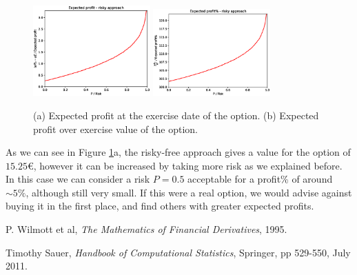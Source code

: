 \documentclass[8 pt]{article}
\begin{document}
\begin{figure}[H]
  \begin{center}
    \includegraphics[width=0.4\textwidth]{graphs/P-oP.eps}
    \includegraphics[width=0.4\textwidth]{graphs/P-Profit.eps}
    \caption{(a) Expected profit at the exercise date of the option. (b) Expected profit over exercise value of the option.}
    \label{fig:oP_plots}
  \end{center}
\end{figure}

As we can see in Figure \ref{fig:oP_plots}a, the risky-free approach gives a value for the option of $15.25$\euro, however it can be increased by taking more risk as we explained before. In this case we can consider a risk $P = 0.5$ acceptable for a profit\% of around $\sim 5\%$, although still very small. If this were a real option, we would advise against buying it in the first place, and find others with greater expected profits.

\begin{thebibliography}{28}
\raggedright
{}

 P. Wilmott et al, \emph{The Mathematics of Financial Derivatives}, 1995.

 Timothy Sauer, \emph{Handbook of Computational Statistics}, Springer, pp 529-550, July 2011.

\end{thebibliography}
\end{document}
